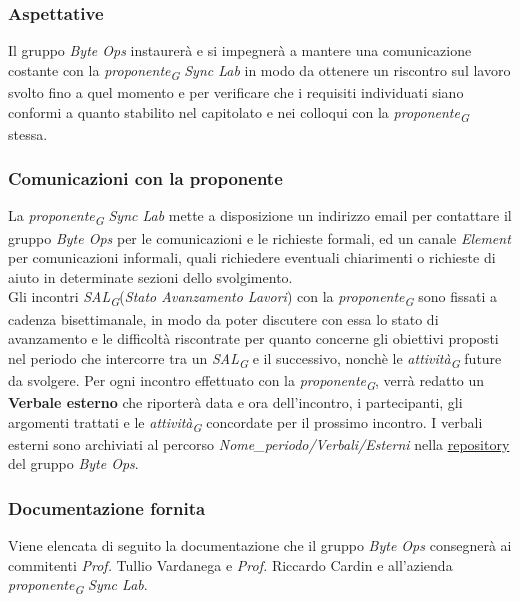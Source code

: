 \subsubsection{Aspettative}
Il gruppo \textit{Byte Ops} instaurerà e si impegnerà a mantere una comunicazione costante con la \textit{proponente}\textsubscript{\textit{G}} \textit{Sync Lab} in modo da ottenere un riscontro sul lavoro svolto fino a quel momento e per verificare che i requisiti individuati siano conformi a quanto stabilito nel capitolato e nei colloqui con la \textit{proponente}\textsubscript{\textit{G}} stessa. \\

\subsubsection{Comunicazioni con la proponente}
La \textit{proponente}\textsubscript{\textit{G}} \textit{Sync Lab} mette a disposizione un indirizzo email per contattare il gruppo \textit{Byte Ops} per le comunicazioni e le richieste formali, ed un canale \textit{Element} per comunicazioni informali, quali richiedere eventuali chiarimenti o richieste di aiuto in determinate sezioni dello svolgimento. \\
Gli incontri \textit{SAL}\textsubscript{\textit{G}}(\textit{Stato Avanzamento Lavori}) con la \textit{proponente}\textsubscript{\textit{G}} sono fissati a cadenza bisettimanale, in modo da poter discutere con essa lo stato di avanzamento e le difficoltà riscontrate per quanto concerne gli obiettivi proposti nel periodo che intercorre tra un \textit{SAL}\textsubscript{\textit{G}} e il successivo, nonchè le \textit{attività}\textsubscript{\textit{G}} future da svolgere. 
Per ogni incontro effettuato con la \textit{proponente}\textsubscript{\textit{G}}, verrà redatto un \textbf{Verbale esterno} che riporterà data e ora dell'incontro, i partecipanti, gli argomenti trattati e le \textit{attività}\textsubscript{\textit{G}} concordate per il prossimo incontro. 
I verbali esterni sono archiviati al percorso \textit{Nome\_periodo/Verbali/Esterni} nella \href{https://github.com/ByteOps-swe/Documents}{repository} del gruppo \textit{Byte Ops}. 

\subsubsection {Documentazione fornita}
Viene elencata di seguito la documentazione che il gruppo \textit{Byte Ops} consegnerà ai commitenti \textit{Prof.} Tullio Vardanega e \textit{Prof.} Riccardo Cardin e all'azienda \textit{proponente}\textsubscript{\textit{G}} \textit{Sync Lab}. 

